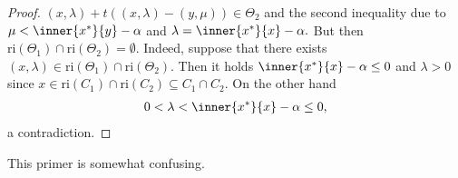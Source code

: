 \begin{proof}
$
  (x,\lambda)
  +
  t
  (
  (x,\lambda)
  -
  (y,\mu)
  )
  \in \Theta_2
$
and the second inequality due to
$
      \mu    
      <
      \inner{x^*}{y} - \alpha
$
and
$
      \lambda
      =
      \inner{x^*}{x} - \alpha
      .
$
But then 
$
\mathrm{ri}(\Theta_1)\cap\mathrm{ri}(\Theta_2)=\emptyset
.
$
Indeed, suppose that there exists 
$
  (x,\lambda)
  \in
  \mathrm{ri}(\Theta_1)\cap\mathrm{ri}(\Theta_2)
  .
$
Then it holds
$
  \inner{x^*}{x}
  -
  \alpha
  \le
  0
$
and $\lambda>0$
since 
$
 x
 \in
  \mathrm{ri}(C_1)\cap\mathrm{ri}(C_2)
  \subseteq
  C_1\cap C_2.
$
On the other hand
\begin{gather}
  0
  <
  \lambda
  <
  \inner{x^*}{x}
  -
  \alpha
  \le
  0
  ,
\end{gather}
a contradiction.
\end{proof}

\begin{takeaways}
  This primer is somewhat confusing.
  \lipsum[5]
\end{takeaways}
